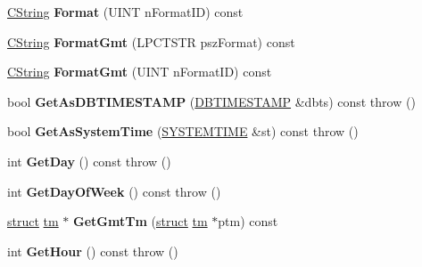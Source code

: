 \begin{DoxyCompactItemize}
\item 
\mbox{\label{class_a_t_l_1_1_c_time_ab6784c084feb5572d2acab64c6233efb}} 
\hyperlink{class_a_t_l_1_1_c_string_t}{C\+String} {\bfseries Format} (U\+I\+NT n\+Format\+ID) const
\item 
\mbox{\label{class_a_t_l_1_1_c_time_ac85cc8332dc21b074c7ea04c469f4213}} 
\hyperlink{class_a_t_l_1_1_c_string_t}{C\+String} {\bfseries Format\+Gmt} (L\+P\+C\+T\+S\+TR psz\+Format) const
\item 
\mbox{\label{class_a_t_l_1_1_c_time_a9a1f88415a61d2f13b9f901454d4863c}} 
\hyperlink{class_a_t_l_1_1_c_string_t}{C\+String} {\bfseries Format\+Gmt} (U\+I\+NT n\+Format\+ID) const
\item 
\mbox{\label{class_a_t_l_1_1_c_time_a2f26c39e3c6ef9100adbda57c325707d}} 
bool {\bfseries Get\+As\+D\+B\+T\+I\+M\+E\+S\+T\+A\+MP} (\hyperlink{struct_d_b_t_i_m_e_s_t_a_m_p}{D\+B\+T\+I\+M\+E\+S\+T\+A\+MP} \&dbts) const  throw ()
\item 
\mbox{\label{class_a_t_l_1_1_c_time_a102dfddf51b08edfad78ddf5f88f0977}} 
bool {\bfseries Get\+As\+System\+Time} (\hyperlink{struct___s_y_s_t_e_m_t_i_m_e}{S\+Y\+S\+T\+E\+M\+T\+I\+ME} \&st) const  throw ()
\item 
\mbox{\label{class_a_t_l_1_1_c_time_a4e89058eed16f07067633ac4f6d91e7d}} 
int {\bfseries Get\+Day} () const  throw ()
\item 
\mbox{\label{class_a_t_l_1_1_c_time_a691bddaa988ed81c3bdfb30b57c96e71}} 
int {\bfseries Get\+Day\+Of\+Week} () const  throw ()
\item 
\mbox{\label{class_a_t_l_1_1_c_time_af33bca2f1047f4f3fd67f593eb43024a}} 
\hyperlink{interfacestruct}{struct} \hyperlink{structtm}{tm} $\ast$ {\bfseries Get\+Gmt\+Tm} (\hyperlink{interfacestruct}{struct} \hyperlink{structtm}{tm} $\ast$ptm) const
\item 
\mbox{\label{class_a_t_l_1_1_c_time_a08722b478b3821fc66ee70edd220c17d}} 
int {\bfseries Get\+Hour} () const  throw ()

\end{DoxyCompactItemize}
